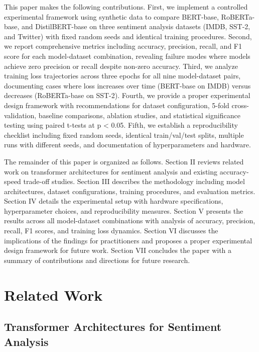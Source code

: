 \documentclass[conference]{IEEEtran}
\begin{document}
This paper makes the following contributions. First, we implement a controlled experimental framework using synthetic data to compare BERT-base, RoBERTa-base, and DistilBERT-base on three sentiment analysis datasets (IMDB, SST-2, and Twitter) with fixed random seeds and identical training procedures. Second, we report comprehensive metrics including accuracy, precision, recall, and F1 score for each model-dataset combination, revealing failure modes where models achieve zero precision or recall despite non-zero accuracy. Third, we analyze training loss trajectories across three epochs for all nine model-dataset pairs, documenting cases where loss increases over time (BERT-base on IMDB) versus decreases (RoBERTa-base on SST-2). Fourth, we provide a proper experimental design framework with recommendations for dataset configuration, 5-fold cross-validation, baseline comparisons, ablation studies, and statistical significance testing using paired t-tests at p < 0.05. Fifth, we establish a reproducibility checklist including fixed random seeds, identical train/val/test splits, multiple runs with different seeds, and documentation of hyperparameters and hardware.

The remainder of this paper is organized as follows. Section II reviews related work on transformer architectures for sentiment analysis and existing accuracy-speed trade-off studies. Section III describes the methodology including model architectures, dataset configurations, training procedures, and evaluation metrics. Section IV details the experimental setup with hardware specifications, hyperparameter choices, and reproducibility measures. Section V presents the results across all model-dataset combinations with analysis of accuracy, precision, recall, F1 scores, and training loss dynamics. Section VI discusses the implications of the findings for practitioners and proposes a proper experimental design framework for future work. Section VII concludes the paper with a summary of contributions and directions for future research.

\section{Related Work}

\subsection{Transformer Architectures for Sentiment Analysis}
\end{document}
